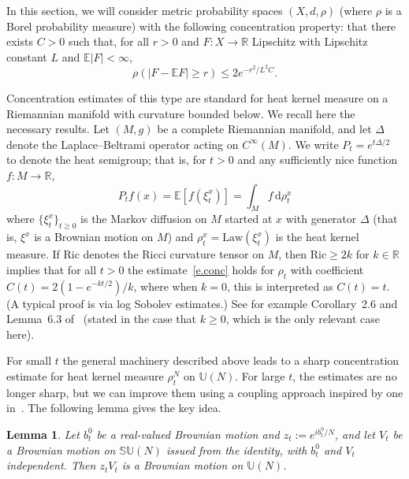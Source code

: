 \documentclass[11pt]{article}
\newtheorem{lemm}[theo]{Lemma}
\theoremstyle{definition}
\numberwithin{equation}{section}
\numberwithin{figure}{section}
\numberwithin{table}{section}
\newcommand{\Unitary}[1]{\mathbb{U}\left(#1\right)}
\newcommand{\SUnitary}[1]{\mathbb{SU}\left(#1\right)}
\newcommand*{\dd}{\mathrm{d}}
\newcommand*{\drho}{\dd \rho}
\begin{document}
In this section, we will consider metric probability spaces $(X,d,\rho)$ (where $\rho$ is a Borel probability measure) with the following concentration property: that there exists $C>0$ such that, for all $r>0$ and $F:X\rightarrow \mathbb{R}$ Lipschitz with Lipschitz constant $L$ and $\mathbb{E}|F|<\infty$,
\begin{equation}\label{e.conc}
\rho\left(\left|F-\mathbb{E}F\right|\ge r\right) \le 2e^{-r^2/L^2C}.
\end{equation}

Concentration estimates of this type are standard for heat kernel measure on a Riemannian manifold with curvature bounded below. We recall here the necessary results. Let $(M,g)$ be a complete Riemannian manifold, and let $\Delta$ denote the Laplace--Beltrami operator acting on $C^{\infty}(M)$. We write $P_t=e^{t\Delta/2}$ to denote the heat semigroup; that is, for $t>0$ and any sufficiently nice function $f:M\rightarrow\mathbb{R}$,
\[
P_tf(x) = \mathbb{E}[f(\xi^x_t)] = \int_M f\,\drho^x_t
\]
where $\{\xi^x_t\}_{t\ge0}$ is the Markov diffusion on $M$ started at $x$ with generator $\Delta$ (that is, $\xi^x$ is a Brownian motion on $M$) and $\rho^x_t=\mathrm{Law}(\xi^x_t)$ is the heat kernel measure. If $\mathrm{Ric}$ denotes the Ricci curvature tensor on $M$, then $\mathrm{Ric}\ge 2k$ for $k\in\mathbb{R}$ implies that for all $t>0$ the estimate~\eqref{e.conc} holds for $\rho_t$ with coefficient $C(t)=2(1-e^{-kt/2})/k$, where when $k=0$, this is interpreted as $C(t)=t$. (A typical proof is via log Sobolev estimates.) See for example Corollary~2.6 and Lemma~6.3 of~\cite{Ledoux1999} (stated in the case that $k\ge0$, which is the only relevant case here).

For small $t$ the general machinery described above leads to a sharp concentration estimate for heat kernel measure $\rho^N_t$ on $\Unitary{N}$. For large $t$, the estimates are no longer sharp, but we can improve them using a coupling approach inspired by one in~\cite{MM-ECP-2013}. The following lemma gives the key idea.

\begin{lemm}\label{l.couple}
Let $b^0_t$ be a real-valued Brownian motion and $z_t := e^{ib_t^0/N}$, and let $V_t$ be a Brownian motion on $\SUnitary{N}$ issued from the identity, with $b^0_t$ and $V_t$ independent. Then $z_tV_t$ is a Brownian motion on $\mathbb{U}(N)$.
\end{lemm}
\end{document}
